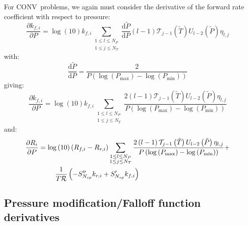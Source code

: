 \documentclass[12pt,number,sort&compress]{elsarticle}
\newcommand{\ns}{N_{sp}}
\newcommand{\conv}{CONV}
\newcommand{\Ru}{\mathcal{R}}
\begin{document}
For \conv~problems, we again must consider the derivative of the forward rate coefficient with respect to pressure:
\begin{equation}
 \frac{\partial {k_{f, i}} }{\partial P } = \log{\left (10 \right )} {k_{f, i}} \sum_{\substack{1 \leq l \leq N_{P}\\1 \leq j \leq N_{T}}} \frac{\text{d} \tilde{P} }{\text{d} P } \left(l - 1\right) \mathcal{T}_{j - 1}\left(\tilde{T}\right) U_{l - 2}\left(\tilde{P}\right) \eta_{l,j}
\end{equation}
with:
\begin{equation}
 \frac{\text{d} \tilde{P} }{\text{d} P } = \frac{2}{P \left(\log{\left (P_{\max} \right )} - \log{\left (P_{\min} \right )}\right)}
\end{equation}
giving:
\begin{equation}
 \frac{\partial {k_{f, i}} }{\partial P } = \log{\left (10 \right )} {k_{f, i}} \sum_{\substack{1 \leq l \leq N_{P}\\1 \leq j \leq N_{T}}} \frac{2 \left(l - 1\right) \mathcal{T}_{j - 1}\left(\tilde{T}\right) U_{l - 2}\left(\tilde{P}\right) \eta_{l,j}}{P \left(\log{\left (P_{\max} \right )} - \log{\left (P_{\min} \right )}\right)}
\end{equation}
and:
\begin{align}
 \frac{\partial R_{i} }{\partial P } &= \log{\left (10 \right )} \left({R_{f, i}} - {R_{r, i}}\right) \sum_{\substack{1 \leq l \leq N_{P}\\1 \leq j \leq N_{T}}} \frac{2 \left(l - 1\right) \mathcal{T}_{j - 1}\left(\tilde{T}\right) U_{l - 2}\left(\tilde{P}\right) \eta_{l,j}}{P \left(\log{\left (P_{\max} \right )} - \log{\left (P_{\min} \right )}\right)} + \nonumber \\
				     & \mathindent \frac{1}{T \Ru} \left(- S^{\prime\prime}_{\ns} {k_{r, i}} + S^{\prime}_{\ns} {k_{f, i}}\right)
\end{align}



\subsection{Pressure modification\slash Falloff function derivatives}
\label{s:dpmod_fall}
\end{document}
